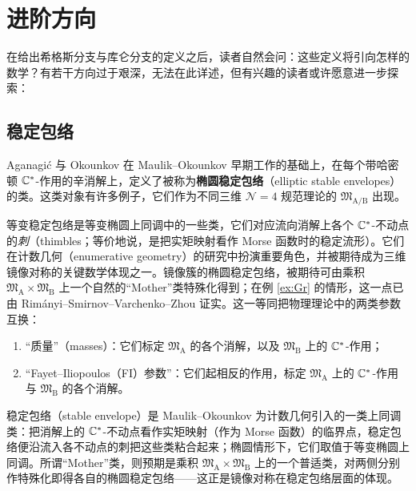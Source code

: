 \section{进阶方向}
\label{sec:advanced}

在给出希格斯分支与库仑分支的定义之后，读者自然会问：这些定义将引向怎样的数学？有若干方向过于艰深，无法在此详述，但有兴趣的读者或许愿意进一步探索：

\subsection{稳定包络}
Aganagi\'c 与 Okounkov \cite{aganagicEllipticStable2020} 在 Maulik–Okounkov 早期工作的基础上，在每个带哈密顿 $\mathbb{C}^*$-作用的辛消解上，定义了被称为{\bf 椭圆稳定包络}（elliptic stable envelopes）的类。这类对象有许多例子，它们作为不同三维 $\mathcal{N}=4$ 规范理论的 $\mathfrak{M}_{\operatorname{A/B}}$ 出现。

等变稳定包络是等变椭圆上同调中的一些类，它们对应流向消解上各个 $\mathbb{C}^*$-不动点的\emph{刺}（thimbles；等价地说，是把实矩映射看作 Morse 函数时的稳定流形）。它们在计数几何（enumerative geometry）的研究中扮演重要角色，并被期待成为三维镜像对称的关键数学体现之一。镜像簇的椭圆稳定包络，被期待可由乘积 $\mathfrak{M}_{\operatorname{A}}\times \mathfrak{M}_{\operatorname{B}}$ 上一个自然的“Mother”类特殊化得到；在例 \ref{ex:Gr} 的情形，这一点已由 Rim\'anyi–Smirnov–Varchenko–Zhou \cite{rimanyi3dMirror2020} 证实。这一等同把物理理论中的两类参数互换：
\begin{enumerate}
    \item “质量”（masses）：它们标定 $\mathfrak{M}_{\operatorname{A}}$ 的各个消解，以及 $\mathfrak{M}_{\operatorname{B}}$ 上的 $\mathbb{C}^*$-作用；
    \item “Fayet–Iliopoulos（FI）参数”：它们起相反的作用，标定 $\mathfrak{M}_{\operatorname{A}}$ 上的 $\mathbb{C}^*$-作用与 $\mathfrak{M}_{\operatorname{B}}$ 的各个消解。
\end{enumerate}

\begin{yizhu}
稳定包络（stable envelope）是 Maulik–Okounkov 为计数几何引入的一类上同调类：把消解上的 $\mathbb{C}^*$-不动点看作实矩映射（作为 Morse 函数）的临界点，稳定包络便沿流入各不动点的刺把这些类粘合起来；椭圆情形下，它们取值于等变椭圆上同调。所谓“Mother”类，则预期是乘积 $\mathfrak{M}_{\operatorname{A}}\times \mathfrak{M}_{\operatorname{B}}$ 上的一个普适类，对两侧分别作特殊化即得各自的椭圆稳定包络——这正是镜像对称在稳定包络层面的体现。
\end{yizhu}

